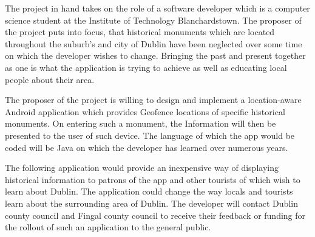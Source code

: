 

The project in hand takes on the role of a software developer which is a computer science student at the Institute of Technology Blanchardstown. The proposer of the project puts into focus, that historical monuments which are located throughout the suburb's and city of Dublin have been neglected over some time on which the developer wishes to change. Bringing the past and present together as one is what the application is trying to achieve as well as educating local people about their area.
\par
The proposer of the project is willing to design and implement a location-aware Android application which provides Geofence locations of specific historical monuments. On entering such a monument, the Information will then be presented to the user of such device. The language of which the app would be coded will be Java on which the developer has learned over numerous years.
\par
The following application would provide an inexpensive way of displaying historical information to patrons of the app and other tourists of which wish to learn about Dublin. The application could change the way locals and tourists learn about the surrounding area of Dublin. The developer will contact Dublin county council and Fingal county council to receive their feedback or funding for the rollout of such an application to the general public.

\smallskip


